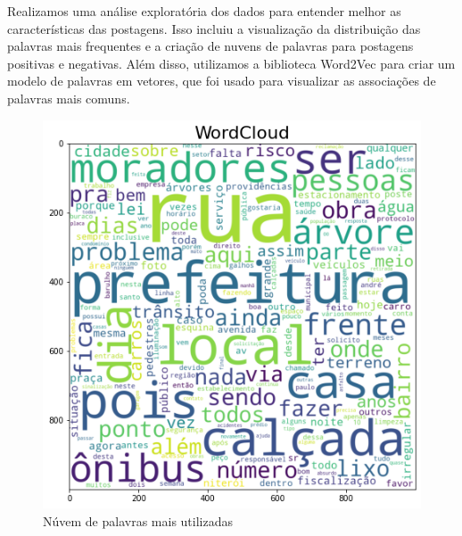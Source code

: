 Realizamos uma análise exploratória dos dados para entender melhor as características das postagens. Isso incluiu a visualização da distribuição das palavras mais frequentes e a criação de nuvens de palavras para postagens positivas e negativas. Além disso, utilizamos a biblioteca Word2Vec para criar um modelo de palavras em vetores, que foi usado para visualizar as associações de palavras mais comuns.

\begin{figure}[!htb]
	\caption{Núvem de palavras mais utilizadas}
	\label{fig:wordcloud}
	\centering
	\includegraphics[scale=0.5]{images/wordcloud.png}
	\fautor
\end{figure}

